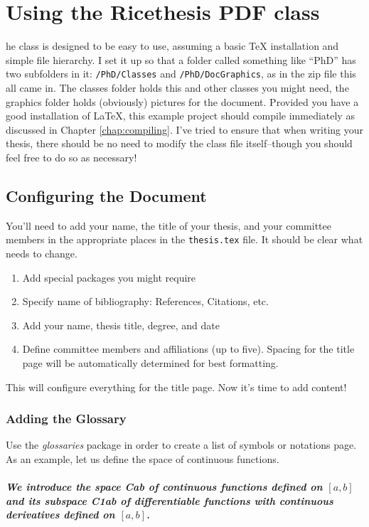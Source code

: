 \chapter{Using the Ricethesis PDF class}

he class is designed to be easy to use, assuming a basic TeX installation and simple file hierarchy.  I set it up so that a folder called something like ``PhD'' has two subfolders in it: \verb+/PhD/Classes+ and \verb+/PhD/DocGraphics+, as in the zip file this all came in.  The classes folder holds this and other classes you might need, the graphics folder holds (obviously) pictures for the document.  Provided you have a good installation of \LaTeX, this example project should compile immediately as discussed in Chapter \ref{chap:compiling}.  I've tried to ensure that when writing your thesis, there should be no need to modify the class file itself--though you should feel free to do so as necessary!

\section{Configuring the Document}

You'll need to add your name, the title of your thesis, and your committee members in the appropriate places in the \verb+thesis.tex+ file.  It should be clear what needs to change.

\begin{enumerate}
	\item Add special packages you might require
	\item Specify name of bibliography: References, Citations, etc.
	\item Add your name, thesis title, degree, and date
	\item Define committee members and affiliations (up to five).  Spacing for the title page will be automatically determined for best formatting.
\end{enumerate}

This will configure everything for the title page.  Now it's time to add content!

\subsection{Adding the Glossary}
Use the {\em glossaries} package in order to create a list of symbols or notations page.  As an example, let us define the space of continuous functions.

\paragraph
{\em
We introduce the space \gls{Cab} of continuous functions defined on $[a,b]$ and its subspace \gls{C1ab} of differentiable functions with continuous derivatives defined on $[a,b]$.
}

